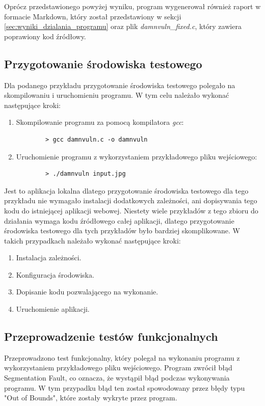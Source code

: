 Oprócz przedstawionego powyżej wyniku, program wygenerował również raport w formacie Markdown, który został przedstawiony w sekcji \ref{sec:wyniki_dzialania_programu} oraz plik \textit{damnvuln\_fixed.c}, który zawiera poprawiony kod źródłowy.
\subsection{Przygotowanie środowiska testowego}
\label{subsec:przygotowanie_srodowiska_testowego}
Dla podanego przykładu przygotowanie środowiska testowego polegało na skompilowaniu i uruchomieniu programu. W tym celu należało wykonać następujące kroki:
\begin{enumerate}
    \item Skompilowanie programu za pomocą kompilatora \textit{gcc}:
    \begin{verbatim}
        > gcc damnvuln.c -o damnvuln
    \end{verbatim}
    \item Uruchomienie programu z wykorzystaniem przykładowego pliku wejściowego:
    \begin{verbatim}
        > ./damnvuln input.jpg
    \end{verbatim}
\end{enumerate}

Jest to aplikacja lokalna dlatego przygotowanie środowiska testowego dla tego przykładu nie wymagało instalacji dodatkowych zależności, ani dopisywania tego kodu do istniejącej aplikacji webowej. Niestety wiele przykładów z tego zbioru do działania wymaga kodu źródłowego całej aplikacji, dlatego przygotowanie środowiska testowego dla tych przykładów było bardziej skomplikowane. W takich przypadkach należało wykonać następujące kroki:
\begin{enumerate}
    \item Instalacja zależności.
    \item Konfiguracja środowiska.
    \item Dopisanie kodu pozwalającego na wykonanie.
    \item Uruchomienie aplikacji.
\end{enumerate}



\subsection{Przeprowadzenie testów funkcjonalnych}
\label{subsec:przeprowadzenie_testow_funkcjonalnych}
Przeprowadzono test funkcjonalny, który polegał na wykonaniu programu z wykorzystaniem przykładowego pliku wejściowego. Program zwrócił błąd Segmentation Fault, co oznacza, że wystąpił błąd podczas wykonywania programu. W tym przypadku błąd ten został spowodowany przez błędy typu "Out of Bounds", które zostały wykryte przez program.

